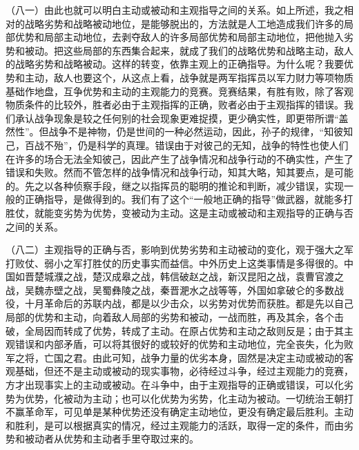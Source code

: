 （八一）由此也就可以明白主动或被动和主观指导之间的关系。如上所述，我之相对的战略劣势和战略被动地位，是能够脱出的，方法就是人工地造成我们许多的局部优势和局部主动地位，去剥夺敌人的许多局部优势和局部主动地位，把他抛入劣势和被动。把这些局部的东西集合起来，就成了我们的战略优势和战略主动，敌人的战略劣势和战略被动。这样的转变，依靠主观上的正确指导。为什么呢？我要优势和主动，敌人也要这个，从这点上看，战争就是两军指挥员以军力财力等项物质基础作地盘，互争优势和主动的主观能力的竞赛。竞赛结果，有胜有败，除了客观物质条件的比较外，胜者必由于主观指挥的正确，败者必由于主观指挥的错误。我们承认战争现象是较之任何别的社会现象更难捉摸，更少确实性，即更带所谓“盖然性”。但战争不是神物，仍是世间的一种必然运动，因此，孙子的规律，“知彼知己，百战不殆”，仍是科学的真理。错误由于对彼己的无知，战争的特性也使人们在许多的场合无法全知彼己，因此产生了战争情况和战争行动的不确实性，产生了错误和失败。然而不管怎样的战争情况和战争行动，知其大略，知其要点，是可能的。先之以各种侦察手段，继之以指挥员的聪明的推论和判断，减少错误，实现一般的正确指导，是做得到的。我们有了这个“一般地正确的指导”做武器，就能多打胜仗，就能变劣势为优势，变被动为主动。这是主动或被动和主观指导的正确与否之间的关系。

（八二）主观指导的正确与否，影响到优势劣势和主动被动的变化，观于强大之军打败仗、弱小之军打胜仗的历史事实而益信。中外历史上这类事情是多得很的。中国如晋楚城濮之战，楚汉成皋之战，韩信破赵之战，新汉昆阳之战，袁曹官渡之战，吴魏赤壁之战，吴蜀彝陵之战，秦晋淝水之战等等，外国如拿破仑的多数战役，十月革命后的苏联内战，都是以少击众，以劣势对优势而获胜。都是先以自己局部的优势和主动，向着敌人局部的劣势和被动，一战而胜，再及其余，各个击破，全局因而转成了优势，转成了主动。在原占优势和主动之敌则反是；由于其主观错误和内部矛盾，可以将其很好的或较好的优势和主动地位，完全丧失，化为败军之将，亡国之君。由此可知，战争力量的优劣本身，固然是决定主动或被动的客观基础，但还不是主动或被动的现实事物，必待经过斗争，经过主观能力的竞赛，方才出现事实上的主动或被动。在斗争中，由于主观指导的正确或错误，可以化劣势为优势，化被动为主动；也可以化优势为劣势，化主动为被动。一切统治王朝打不赢革命军，可见单是某种优势还没有确定主动地位，更没有确定最后胜利。主动和胜利，是可以根据真实的情况，经过主观能力的活跃，取得一定的条件，而由劣势和被动者从优势和主动者手里夺取过来的。

